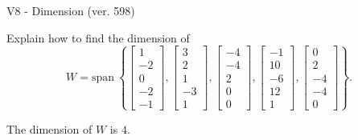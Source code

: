 \begin{exercise}
  \begin{exerciseTitle}V8 - Dimension (ver. 598)\end{exerciseTitle}
  \begin{exerciseStatement}
    Explain how to find the dimension of 
\[W=\mathrm{span}\ \left\{\left[\begin{array}{r}
1 \\
-2 \\
0 \\
-2 \\
-1
\end{array}\right] , \left[\begin{array}{r}
3 \\
2 \\
1 \\
-3 \\
1
\end{array}\right] , \left[\begin{array}{r}
-4 \\
-4 \\
2 \\
0 \\
0
\end{array}\right] , \left[\begin{array}{r}
-1 \\
10 \\
-6 \\
12 \\
1
\end{array}\right] , \left[\begin{array}{r}
0 \\
2 \\
-4 \\
-4 \\
0
\end{array}\right]\right\}.\]



  \end{exerciseStatement}
  \begin{exerciseAnswer}
   The dimension of \(W\) is  \(4\).
  


  \end{exerciseAnswer}
\end{exercise}